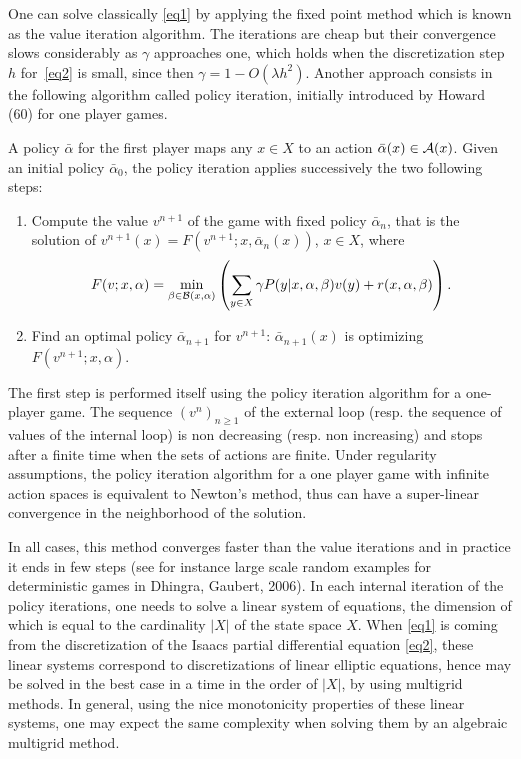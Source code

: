 \documentclass{report}
\begin{document}
One can solve classically \eqref{eq1} by applying
the fixed point method which is
known as the value iteration algorithm.
The iterations are cheap but their convergence
slows considerably
as $\gamma$ approaches one, which holds
when the discretization step $h$ for~\eqref{eq2} is small,
since then $\gamma=1-O(\lambda h^2)$.
Another approach consists in the following
algorithm called policy iteration, initially introduced by Howard
(60) for one player games.

A policy $\bar{\alpha}$ for the first player
maps any $x\in X$ to an action ${\bar{\alpha}}(x)\in \mathcal{A}(x)$.
Given an initial policy $\bar{\alpha}_0$, the
policy iteration applies successively the two following
steps:
\begin{enumerate}
\item Compute the value $v^{n+1}$ of the game with fixed policy
$\bar{\alpha}_n$, that is the solution of
$v^{n+1}(x) = F(v^{n+1}; x,\bar{\alpha}_n(x))$, $x \in X$, where
$$
F(v; x, \alpha) = \min_{\beta \in \mathcal{B}(x,\alpha)} \left( \sum_{y \in X} \gamma P(y|x, \alpha, \beta) v(y) + r(x,\alpha, \beta) \right) .
$$

\item Find an optimal policy $\bar{\alpha}_{n+1}$ for $v^{n+1}$:
$\bar{\alpha}_{n+1}(x)$ is optimizing $F (v^{n+1};x,\alpha)$.
\end{enumerate}

The first step is performed itself using the policy iteration
algorithm for a one-player game.
The sequence $(v^n)_{n\geq 1}$ of the external loop (resp. the sequence of values
of the internal
loop) is non decreasing (resp. non increasing) and stops after a
finite time when the sets of actions are finite.
Under regularity assumptions, the policy
iteration algorithm for a one player game with infinite action spaces
is equivalent to Newton's method, thus can have a
super-linear convergence in the neighborhood of the solution.

In all cases, this method converges faster than the
value iterations and in practice it ends in few steps
(see for instance large scale random examples for deterministic games
in Dhingra, Gaubert, 2006).
In each internal iteration of the policy iterations, one needs to
solve a linear system of equations,
the dimension of which is equal to the cardinality $|X|$ of the state space
$X$.
When \eqref{eq1} is coming from the discretization of the
Isaacs partial differential equation
\eqref{eq2}, these linear systems correspond to discretizations of linear
elliptic equations, hence may be solved in the
best case in a time in the order of $|X|$,
by using multigrid methods.
In general, using the nice monotonicity properties of these linear
systems, one may expect the same complexity when solving
them by an algebraic multigrid method.
\end{document}

